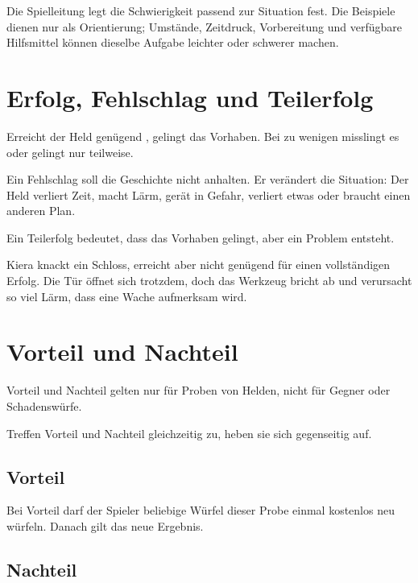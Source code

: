Die Spielleitung legt die Schwierigkeit passend zur Situation fest. Die Beispiele dienen nur als Orientierung; Umstände, Zeitdruck, Vorbereitung und verfügbare Hilfsmittel können dieselbe Aufgabe leichter oder schwerer machen.

\section{Erfolg, Fehlschlag und Teilerfolg}

Erreicht der Held genügend \star, gelingt das Vorhaben. Bei zu wenigen \star{} misslingt es oder gelingt nur teilweise.

Ein Fehlschlag soll die Geschichte nicht anhalten. Er verändert die Situation: Der Held verliert Zeit, macht Lärm, gerät in Gefahr, verliert etwas oder braucht einen anderen Plan.

Ein Teilerfolg bedeutet, dass das Vorhaben gelingt, aber ein Problem entsteht.

\begin{beispiel}[title=Teilerfolg]
Kiera knackt ein Schloss, erreicht aber nicht genügend \star{} für einen vollständigen Erfolg. Die Tür öffnet sich trotzdem, doch das Werkzeug bricht ab und verursacht so viel Lärm, dass eine Wache aufmerksam wird.
\end{beispiel}

\section{Vorteil und Nachteil}

\begin{kurzregel}[title=Vorteil und Nachteil]
Vorteil und Nachteil gelten nur für Proben von Helden, nicht für Gegner oder Schadenswürfe.

Treffen Vorteil und Nachteil gleichzeitig zu, heben sie sich gegenseitig auf.
\end{kurzregel}

\subsection{Vorteil}

Bei Vorteil darf der Spieler beliebige Würfel dieser Probe einmal kostenlos neu würfeln. Danach gilt das neue Ergebnis.

\subsection{Nachteil}

